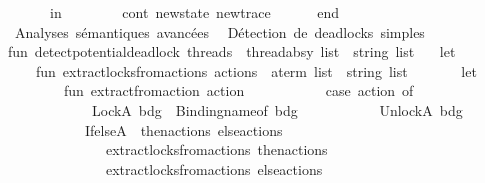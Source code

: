 \begin{isabellebody}
\ \ \ \ \ \ in\isanewline
\ \ \ \ \ \ \ \ cont\ {\isacharparenleft}{\kern0pt}new{\isacharunderscore}{\kern0pt}state{\isacharcomma}{\kern0pt}\ new{\isacharunderscore}{\kern0pt}trace{\isacharparenright}{\kern0pt}\isanewline
\ \ \ \ \ \ end\isanewline
\isanewline
{\isacharparenleft}{\kern0pt}{\isacharasterisk}{\kern0pt}\ Analyses\ sémantiques\ avancées\ {\isacharasterisk}{\kern0pt}{\isacharparenright}{\kern0pt}\isanewline
\isanewline
{\isacharparenleft}{\kern0pt}{\isacharasterisk}{\kern0pt}\ Détection\ de\ deadlocks\ simples\ {\isacharasterisk}{\kern0pt}{\isacharparenright}{\kern0pt}\isanewline
fun\ detect{\isacharunderscore}{\kern0pt}potential{\isacharunderscore}{\kern0pt}deadlock\ {\isacharparenleft}{\kern0pt}threads\ {\isacharcolon}{\kern0pt}\ thread{\isacharunderscore}{\kern0pt}absy\ list{\isacharparenright}{\kern0pt}\ {\isacharcolon}{\kern0pt}\ string\ list\ {\isacharequal}{\kern0pt}\isanewline
\ \ let\isanewline
\ \ \ \ fun\ extract{\isacharunderscore}{\kern0pt}locks{\isacharunderscore}{\kern0pt}from{\isacharunderscore}{\kern0pt}actions\ {\isacharparenleft}{\kern0pt}actions\ {\isacharcolon}{\kern0pt}\ a{\isacharunderscore}{\kern0pt}term\ list{\isacharparenright}{\kern0pt}\ {\isacharcolon}{\kern0pt}\ string\ list\ {\isacharequal}{\kern0pt}\isanewline
\ \ \ \ \ \ let\isanewline
\ \ \ \ \ \ \ \ fun\ extract{\isacharunderscore}{\kern0pt}from{\isacharunderscore}{\kern0pt}action\ action\ {\isacharequal}{\kern0pt}\isanewline
\ \ \ \ \ \ \ \ \ \ case\ action\ of\isanewline
\ \ \ \ \ \ \ \ \ \ \ \ LockA\ bdg\ {\isacharequal}{\kern0pt}{\isachargreater}{\kern0pt}\ {\isacharbrackleft}{\kern0pt}Binding{\isachardot}{\kern0pt}name{\isacharunderscore}{\kern0pt}of\ bdg{\isacharbrackright}{\kern0pt}\isanewline
\ \ \ \ \ \ \ \ \ \ {\isacharbar}{\kern0pt}\ UnlockA\ bdg\ {\isacharequal}{\kern0pt}{\isachargreater}{\kern0pt}\ {\isacharbrackleft}{\kern0pt}{\isacharbrackright}{\kern0pt}\isanewline
\ \ \ \ \ \ \ \ \ \ {\isacharbar}{\kern0pt}\ IfelseA\ {\isacharparenleft}{\kern0pt}{\isacharparenleft}{\kern0pt}{\isacharunderscore}{\kern0pt}{\isacharcomma}{\kern0pt}\ then{\isacharunderscore}{\kern0pt}actions{\isacharparenright}{\kern0pt}{\isacharcomma}{\kern0pt}\ else{\isacharunderscore}{\kern0pt}actions{\isacharparenright}{\kern0pt}\ {\isacharequal}{\kern0pt}{\isachargreater}{\kern0pt}\isanewline
\ \ \ \ \ \ \ \ \ \ \ \ \ \ {\isacharparenleft}{\kern0pt}extract{\isacharunderscore}{\kern0pt}locks{\isacharunderscore}{\kern0pt}from{\isacharunderscore}{\kern0pt}actions\ then{\isacharunderscore}{\kern0pt}actions{\isacharparenright}{\kern0pt}\ {\isacharat}{\kern0pt}\ \isanewline
\ \ \ \ \ \ \ \ \ \ \ \ \ \ {\isacharparenleft}{\kern0pt}extract{\isacharunderscore}{\kern0pt}locks{\isacharunderscore}{\kern0pt}from{\isacharunderscore}{\kern0pt}actions\ else{\isacharunderscore}{\kern0pt}actions{\isacharparenright}{\kern0pt}\isanewline

\end{isabellebody}
